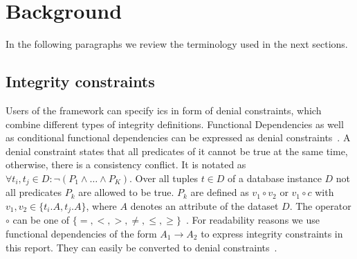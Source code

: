 \section{Background}\label{sec:background}
  In the following paragraphs we review the terminology used in the next sections.
  
  \subsection{Integrity constraints}
  Users of the \holoclean{} framework can specify \glspl{ic} in form of denial constraints, which combine different types of integrity definitions.
  Functional Dependencies as well as conditional functional dependencies can be expressed as denial constraints~\cite{fd_to_dc}.
  A denial constraint states that all predicates of it cannot be true at the same time, otherwise, there is a consistency conflict.
  It is notated as $\forall t_i, t_j \in D: \neg(P_1 \wedge \dots \wedge P_K)$.
  Over all tuples $t \in D$ of a database instance $D$ not all predicates $P_k$ are allowed to be true.
  $P_k$ are defined as $v_1 \circ v_2$ or $v_1 \circ c$ with $v_1, v_2 \in \{t_i.A, t_j.A\}$, where $A$ denotes an attribute of the dataset $D$.
  The operator $\circ$ can be one of $\{=,<,>,\neq,\leq,\geq\}$~\cite{chu2013discoveringdc}.
  For readability reasons we use functional dependencies of the form $A_1 \to A_2$ to express integrity constraints in this report.
  They can easily be converted to denial constraints~\cite{fd_to_dc}.
  
